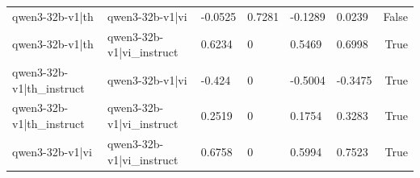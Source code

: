 \begin{table}
\begin{tabular}{llllllr}
qwen3-32b-v1|th & qwen3-32b-v1|vi & -0.0525 & 0.7281 & -0.1289 & 0.0239 & False \\
qwen3-32b-v1|th & qwen3-32b-v1|vi_instruct & 0.6234 & 0 & 0.5469 & 0.6998 & True \\
qwen3-32b-v1|th_instruct & qwen3-32b-v1|vi & -0.424 & 0 & -0.5004 & -0.3475 & True \\
qwen3-32b-v1|th_instruct & qwen3-32b-v1|vi_instruct & 0.2519 & 0 & 0.1754 & 0.3283 & True \\
qwen3-32b-v1|vi & qwen3-32b-v1|vi_instruct & 0.6758 & 0 & 0.5994 & 0.7523 & True \\
\bottomrule
\end{tabular}
\end{table}
